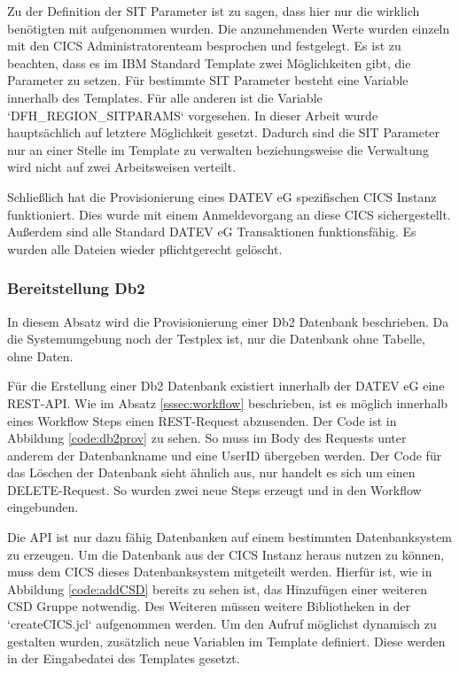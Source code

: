 Zu der Definition der SIT Parameter ist zu sagen, dass hier nur die wirklich benötigten mit aufgenommen wurden.
Die anzunehmenden Werte wurden einzeln mit den CICS Administratorenteam besprochen und festgelegt.
Es ist zu beachten, dass es im IBM Standard Template zwei Möglichkeiten gibt, die Parameter zu setzen.
Für bestimmte SIT Parameter besteht eine Variable innerhalb des Templates.
Für alle anderen ist die Variable `DFH\_REGION\_SITPARAMS` vorgesehen.
In dieser Arbeit wurde hauptsächlich auf letztere Möglichkeit gesetzt.
Dadurch sind die SIT Parameter nur an einer Stelle im Template zu verwalten beziehungsweise die Verwaltung wird nicht auf zwei Arbeitsweisen verteilt.

Schließlich hat die Provisionierung eines DATEV eG spezifischen CICS Instanz funktioniert.
Dies wurde mit einem Anmeldevorgang an diese CICS sichergestellt.
Außerdem sind alle Standard DATEV eG Transaktionen funktionsfähig.
Es wurden alle Dateien wieder pflichtgerecht gelöscht.

\subsubsection{Bereitstellung Db2}\label{sssec:db2tpl}
In diesem Absatz wird die Provisionierung einer Db2 Datenbank beschrieben.
Da die Systemumgebung noch der Testplex ist, nur die Datenbank ohne Tabelle, ohne Daten.

Für die Erstellung einer Db2 Datenbank existiert innerhalb der DATEV eG eine REST-API.
Wie im Absatz \ref{sssec:workflow} beschrieben, ist es möglich innerhalb eines Workflow Steps einen REST-Request abzusenden.
Der Code ist in Abbildung \ref{code:db2prov} zu sehen.
So muss im Body des Requests unter anderem der Datenbankname und eine UserID übergeben werden.
Der Code für das Löschen der Datenbank sieht ähnlich aus, nur handelt es sich um einen DELETE-Request.
So wurden zwei neue Steps erzeugt und in den Workflow eingebunden.

Die API ist nur dazu fähig Datenbanken auf einem bestimmten Datenbanksystem zu erzeugen.
Um die Datenbank aus der CICS Instanz heraus nutzen zu können, muss dem CICS dieses Datenbanksystem mitgeteilt werden.
Hierfür ist, wie in Abbildung \ref{code:addCSD} bereits zu sehen ist, das Hinzufügen einer weiteren CSD Gruppe notwendig.
Des Weiteren müssen weitere Bibliotheken in der `createCICS.jcl` aufgenommen werden.
Um den Aufruf möglichst dynamisch zu gestalten wurden, zusätzlich neue Variablen im Template definiert.
Diese werden in der Eingabedatei des Templates gesetzt.

